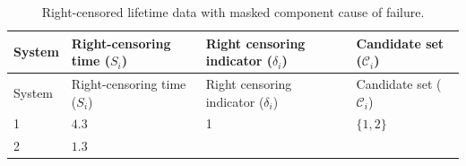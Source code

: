 \documentclass[
]{article}
\begin{document}
\begin{longtable}[]{@{}llll@{}}
\caption{Right-censored lifetime data with masked component cause of
failure.}\tabularnewline
\toprule
\begin{minipage}[b]{0.07\columnwidth}\raggedright
System\strut
\end{minipage} & \begin{minipage}[b]{0.30\columnwidth}\raggedright
Right-censoring time (\(S_i\))\strut
\end{minipage} & \begin{minipage}[b]{0.30\columnwidth}\raggedright
Right censoring indicator (\(\delta_i\))\strut
\end{minipage} & \begin{minipage}[b]{0.23\columnwidth}\raggedright
Candidate set (\(\mathcal{C}_i\))\strut
\end{minipage}\tabularnewline
\midrule
\endfirsthead
\toprule
\begin{minipage}[b]{0.07\columnwidth}\raggedright
System\strut
\end{minipage} & \begin{minipage}[b]{0.30\columnwidth}\raggedright
Right-censoring time (\(S_i\))\strut
\end{minipage} & \begin{minipage}[b]{0.30\columnwidth}\raggedright
Right censoring indicator (\(\delta_i\))\strut
\end{minipage} & \begin{minipage}[b]{0.23\columnwidth}\raggedright
Candidate set (\(\mathcal{C}_i\))\strut
\end{minipage}\tabularnewline
\midrule
\endhead
\begin{minipage}[t]{0.07\columnwidth}\raggedright
1\strut
\end{minipage} & \begin{minipage}[t]{0.30\columnwidth}\raggedright
\(4.3\)\strut
\end{minipage} & \begin{minipage}[t]{0.30\columnwidth}\raggedright
1\strut
\end{minipage} & \begin{minipage}[t]{0.23\columnwidth}\raggedright
\(\{1,2\}\)\strut
\end{minipage}\tabularnewline
\begin{minipage}[t]{0.07\columnwidth}\raggedright
2\strut
\end{minipage} & \begin{minipage}[t]{0.30\columnwidth}\raggedright
\(1.3\)\strut

\end{minipage}
\end{longtable}
\end{document}
